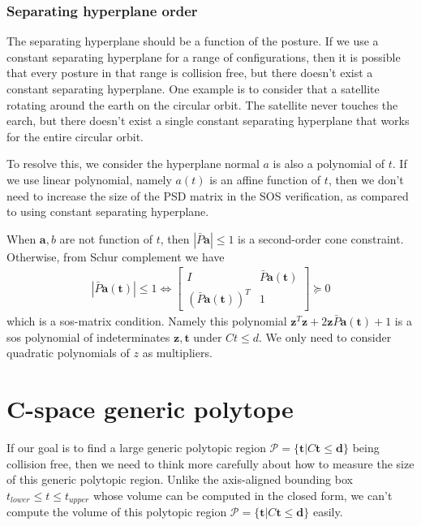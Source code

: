 \documentclass{article}
\renewcommand{\vec}[1]{\mathbf{#1}}
\begin{document}
\subsubsection{Separating hyperplane order}
The separating hyperplane should be a function of the posture. If we use a constant separating hyperplane for a range of configurations, then it is possible that every posture in that range is collision free, but there doesn't exist a constant separating hyperplane. One example is to consider that a satellite rotating around the earth on the circular orbit. The satellite never touches the earch, but there doesn't exist a single constant separating hyperplane that works for the entire circular orbit.

To resolve this, we consider the hyperplane normal $a$ is also a polynomial of $t$. If we use linear polynomial, namely $a(t)$ is an affine function of $t$, then we don't need to increase the size of the PSD matrix in the SOS verification, as compared to using constant separating hyperplane.

When $\vec{a}, b$ are not function of $t$, then $|\bar{P}\vec{a}|\le 1$ is a second-order cone constraint. Otherwise, from Schur complement we have
\begin{align}
	|\bar{P}\vec{a}(\vec{t})|\le 1 \Leftrightarrow \begin{bmatrix} I & \bar{P}\vec{a}(\vec{t})\\ (\bar{P}\vec{a}(\vec{t}))^T & 1\end{bmatrix}\succeq 0
\end{align}
which is a sos-matrix condition. Namely this polynomial $\vec{z}^T\vec{z} + 2\vec{z}\bar{P}\vec{a}(\vec{t}) + 1$ is a sos polynomial of indeterminates $\vec{z}, \vec{t}$ under $Ct\le d$. We only need to consider quadratic polynomials of $z$ as multipliers.

\section{C-space generic polytope}
If our goal is to find a large generic polytopic region $\mathcal{P}=\{\vec{t} | C\vec{t}\le \vec{d}\}$ being collision free, then we need to think more carefully about how to measure the size of this generic polytopic region. Unlike the axis-aligned bounding box $t_{lower}\le t \le t_{upper}$ whose volume can be computed in the closed form, we can't compute the volume of this polytopic region $\mathcal{P}=\{\vec{t} | C\vec{t} \le \vec{d}\}$ easily.
\end{document}
